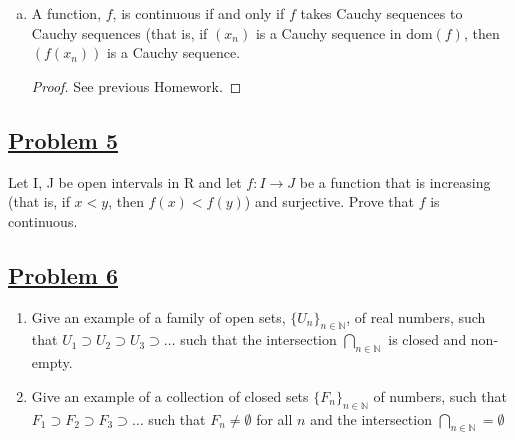 \documentclass[10pt,letterpaper]{article}
\begin{document}
\begin{enumerate}[(a)]
\begin{proof}
	
\end{proof}


	\item A function, $f$, is continuous if and only if $f$ takes Cauchy sequences to Cauchy sequences (that is, if
$(x_n)$ is a Cauchy sequence in $\mathrm{dom}(f)$, then $(f(x_n))$ is a Cauchy sequence.	
	\begin{proof}
	See previous Homework.
	\end{proof}
	\end{enumerate}
	
	\subsection*{{\color{purple}\underline{Problem 5}}}
	Let I, J be open intervals in R and let $f : I \rightarrow J$ be a function that is increasing (that is, if
	$x < y$, then $f(x) < f(y)$) and surjective. Prove that $f$ is continuous.
	
	\subsection*{{\color{purple}\underline{Problem 6}}}
	\begin{enumerate}	
	\item Give an example of a family of open sets, $\{U_n\}_{n \in \mathbb{N}}$, of real numbers, 
	such that $U_1 \supset U_2 \supset U_3 \supset \ldots$ such that the intersection
	$\displaystyle\bigcap_{n \in \mathbb{N}}$ is closed and non-empty.
	\item 
	Give an example of a collection of closed sets $\{F_n\}_{n \in \mathbb{N}}$ of numbers, such that 
	$F_1 \supset F_2 \supset F_3 \supset \ldots$ such that
	$F_n \neq \emptyset$ for all $n$ and the intersection $\displaystyle\bigcap_{n \in \mathbb{N}} = \emptyset$
	\end{enumerate}
	
\end{document}
